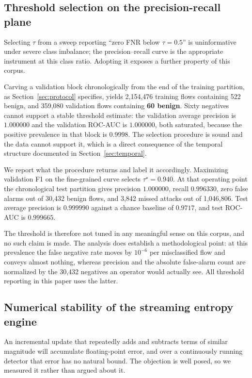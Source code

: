 \documentclass{ieeeaccess}
\begin{document}
\subsection{Threshold selection on the precision-recall plane}
\label{sec:threshold}
Selecting $\tau$ from a sweep reporting ``zero FNR below $\tau=0.5$'' is
uninformative under severe class imbalance; the precision--recall curve is the
appropriate instrument at this class ratio. Adopting it exposes a further
property of this corpus.

Carving a validation block chronologically from the end of the training
partition, as Section~\ref{sec:protocol} specifies, yields 2{,}154{,}476 training
flows containing 522 benign, and 359{,}080 validation flows containing
\textbf{60 benign}. Sixty negatives cannot support a stable threshold estimate:
the validation average precision is $1.000000$ and the validation ROC-AUC is
$1.000000$, both saturated, because the positive prevalence in that block is
$0.9998$. The selection procedure is sound and the data cannot support it, which
is a direct consequence of the temporal structure documented in
Section~\ref{sec:temporal}.

We report what the procedure returns and label it accordingly. Maximizing
validation F1 on the fine-grained curve selects $\tau^{\star} = 0.940$. At that
operating point the chronological test partition gives precision $1.000000$,
recall $0.996330$, zero false alarms out of 30{,}432 benign flows, and 3{,}842
missed attacks out of 1{,}046{,}806. Test average precision is $0.999990$ against
a chance baseline of $0.9717$, and test ROC-AUC is $0.999665$.

The threshold is therefore not tuned in any meaningful sense on this corpus,
and no such claim is made. The analysis does establish a methodological point:
at this prevalence the false negative rate moves by
$10^{-6}$ per misclassified flow and conveys almost nothing, whereas precision
and the absolute false-alarm count are normalized by the 30{,}432 negatives an
operator would actually see. All threshold reporting in this paper uses the
latter.

\subsection{Numerical stability of the streaming entropy engine}
\label{sec:numerics}
An incremental update that repeatedly adds and subtracts terms of similar
magnitude will accumulate floating-point error, and over a continuously running
detector that error has no natural bound. The objection is well posed, so we
measured it rather than argued about it.
\end{document}
